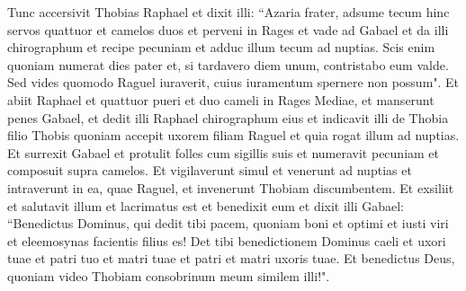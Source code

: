 \begin{biblechapter}  
\verse Tunc accersivit Thobias Raphael et dixit illi: 
\verse “Azaria frater, adsume tecum hinc servos quattuor et camelos duos et perveni in Rages et vade ad Gabael et da illi chirographum et recipe pecuniam et adduc illum tecum ad nuptias. 
\verse Scis enim quoniam numerat dies pater et, si tardavero diem unum, contristabo eum valde. 
\verse Sed vides quomodo Raguel iuraverit, cuius iuramentum spernere non possum". 
\verse Et abiit Raphael et quattuor pueri et duo cameli in Rages Mediae, et manserunt penes Gabael, et dedit illi Raphael chirographum eius et indicavit illi de Thobia filio Thobis quoniam accepit uxorem filiam Raguel et quia rogat illum ad nuptias. Et surrexit Gabael et protulit folles cum sigillis suis et numeravit pecuniam et composuit supra camelos. 
\verse Et vigilaverunt simul et venerunt ad nuptias et intraverunt in ea, quae Raguel, et invenerunt Thobiam discumbentem. Et exsiliit et salutavit illum et lacrimatus est et benedixit eum et dixit illi Gabael: “Benedictus Dominus, qui dedit tibi pacem, quoniam boni et optimi et iusti viri et eleemosynas facientis filius es! Det tibi benedictionem Dominus caeli et uxori tuae et patri tuo et matri tuae et patri et matri uxoris tuae. Et benedictus Deus, quoniam video Thobiam consobrinum meum similem illi!". 
\end{biblechapter}

